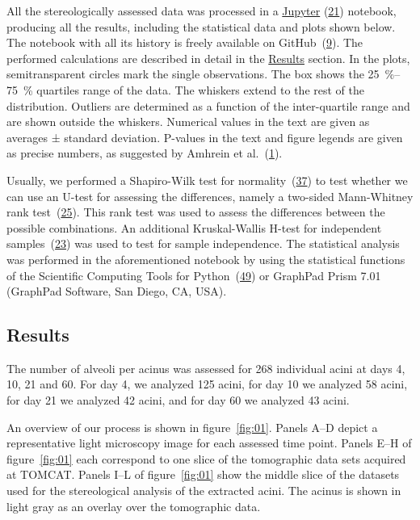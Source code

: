\documentclass[
  american,
]{article}
\begin{document}
All the stereologically assessed data was processed in a \href{http://jupyter.org/}{Jupyter} (\protect\hyperlink{ref-pQ6Wbz73}{21}) notebook, producing all the results, including the statistical data and plots shown below.
The notebook with all its history is freely available on GitHub~(\protect\hyperlink{ref-V87xbt0b}{9}).
The performed calculations are described in detail in the \protect\hyperlink{results}{Results} section.
In the plots, semitransparent circles mark the single observations.
The box shows the 25~\%--75~\% quartiles range of the data.
The whiskers extend to the rest of the distribution.
Outliers are determined as a function of the inter-quartile range and are shown outside the whiskers.
Numerical values in the text are given as averages ± standard deviation.
P-values in the text and figure legends are given as precise numbers, as suggested by Amhrein et al.~(\protect\hyperlink{ref-o21zxPIu}{1}).

Usually, we performed a Shapiro-Wilk test for normality~(\protect\hyperlink{ref-IkHrgIj3}{37}) to test whether we can use an U-test for assessing the differences, namely a two-sided Mann-Whitney rank test~(\protect\hyperlink{ref-MyzxBJ57}{25}).
This rank test was used to assess the differences between the possible combinations.
An additional Kruskal-Wallis H-test for independent samples~(\protect\hyperlink{ref-ON1Bppkk}{23}) was used to test for sample independence.
The statistical analysis was performed in the aforementioned notebook by using the statistical functions of the Scientific Computing Tools for Python~(\protect\hyperlink{ref-8Miti2Gz}{49}) or GraphPad Prism 7.01 (GraphPad Software, San Diego, CA, USA).

\hypertarget{results}{%
\subsection{Results}\label{results}}

The number of alveoli per acinus was assessed for 268 individual acini at days 4, 10, 21 and 60.
For day 4, we analyzed 125 acini, for day 10 we analyzed 58 acini, for day 21 we analyzed 42 acini, and for day 60 we analyzed 43 acini.

An overview of our process is shown in figure~\ref{fig:01}.
Panels A--D depict a representative light microscopy image for each assessed time point.
Panels E--H of figure~\ref{fig:01} each correspond to one slice of the tomographic data sets acquired at TOMCAT.
Panels I--L of figure~\ref{fig:01} show the middle slice of the datasets used for the stereological analysis of the extracted acini.
The acinus is shown in light gray as an overlay over the tomographic data.
\end{document}
